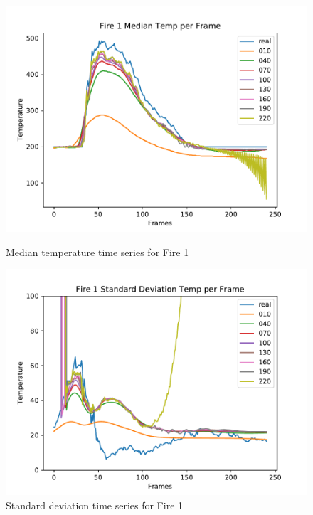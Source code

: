\documentclass{article}
\begin{document}
\begin{figure}[ht]
  \begin{minipage}[b]{0.5\linewidth}
    \centering
    \includegraphics[width=1.1\linewidth]{../plots/f1_mediantemp.pdf} 
    \caption{Median temperature time series for Fire 1} 
    \vspace{4ex}
  \end{minipage}%
  \begin{minipage}[b]{0.5\linewidth}
    \centering
    \includegraphics[width=1.1\linewidth]{../plots/f1_stdtemp.pdf} 
    \caption{Standard deviation time series for Fire 1} 
    \vspace{4ex}
  \end{minipage} 
\end{figure}
\end{document}
